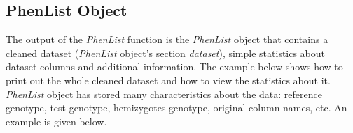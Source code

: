 \documentclass[a4paper]{article}
\begin{document}
\subsection{PhenList Object}
The output of the \textit{PhenList} function is the \textit{PhenList} object that contains a cleaned dataset (\textit{PhenList} object's section \textit{dataset}), simple statistics about dataset columns and additional information. 
\newline\newline
The example below shows how to print out the whole cleaned dataset and how to view the statistics about it. 
\textit{PhenList} object has stored many characteristics about the data: reference genotype, test genotype, hemizygotes genotype, original column names, etc.
\newline
An example is given below.
\begin{Schunk}
\end{Schunk}
\end{document}
